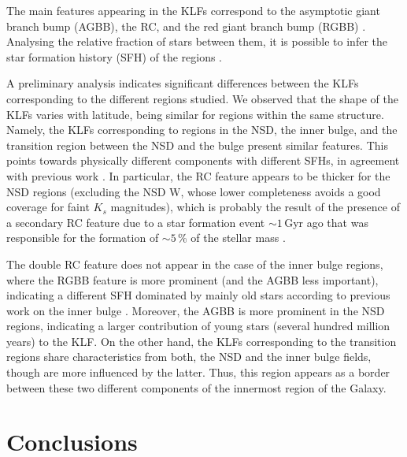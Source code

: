 \documentclass{aa}
\begin{document}
The main features appearing in the KLFs correspond to the asymptotic giant branch bump (AGBB), the RC, and the red giant branch bump (RGBB) \citep[see Fig.\,2 in supplementary material of][]{Nogueras-Lara:2019ad}. Analysing the relative fraction of stars between them, it is possible to infer the star formation history (SFH) of the regions \citep[e.g.][]{Nogueras-Lara:2019ad}. 

A preliminary analysis indicates significant differences between the KLFs corresponding to the different regions studied. We observed that the shape of the KLFs varies with latitude, being similar for regions within the same structure. Namely, the KLFs corresponding to regions in the NSD, the inner bulge, and the transition region between the NSD and the bulge present similar features. This points towards physically different components with different SFHs, in agreement with previous work \citep[e.g.][]{Launhardt:2002nx,Nishiyama:2013uq,Nogueras-Lara:2018ab,gallego-cano2019,Nogueras-Lara:2019ad}. In particular, the RC feature appears to be thicker for the NSD regions (excluding the NSD W, whose lower completeness avoids a good coverage for faint $K_s$ magnitudes), which is probably the result of the presence of a secondary RC feature due to a star formation event $\sim1$\,Gyr ago that was responsible for the formation of $\sim5$\,\% of the stellar mass \citep{Nogueras-Lara:2019ad}.%

The double RC feature does not appear in the case of the inner bulge regions, where the RGBB feature is more prominent (and the AGBB less important), indicating a different SFH dominated by mainly old stars according to previous work on the inner bulge \citep{Nogueras-Lara:2018ab}. Moreover, the AGBB is more prominent in the NSD regions, indicating a larger contribution of young stars (several hundred million years) to the KLF. On the other hand, the KLFs corresponding to the transition regions share characteristics from both, the NSD and the inner bulge fields, though are more influenced by the latter. Thus, this region appears as a border between these two different components of the innermost region of the Galaxy. 








\section{Conclusions}
    
\end{document}
